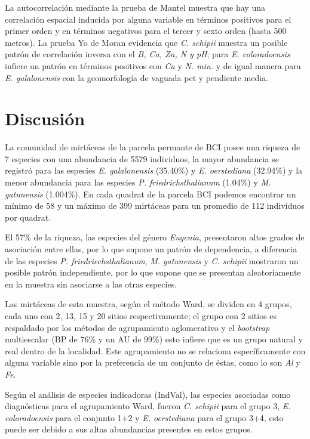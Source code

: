 \documentclass[11pt,]{article}
\begin{document}
La autocorrelación mediante la prueba de Mantel muestra que hay una
correlación espacial inducida por alguna variable en términos positivos
para el primer orden y en términos negativos para el tercer y sexto
orden (hasta 500 metros). La prueba Yo de Moran evidencia que \emph{C.
schipii} muestra un posible patrón de correlación inversa con el
\emph{B, Ca, Zn, N y pH}; para \emph{E. coloradoensis} infiere un patrón
en términos positivos con \emph{Ca} y \emph{N. min.} y de igual manera
para \emph{E. galalonensis} con la geomorfología de vaguada pct y
pendiente media.

\section{Discusión}\label{discusiuxf3n}

La comunidad de mirtáceas de la parcela permante de BCI posee una
riqueza de 7 especies con una abundancia de 5579 individuos, la mayor
abundancia se registró para las especies \emph{E. galalonensis}
(35.40\%) y \emph{E. oerstediana} (32.94\%) y la menor abundancia para
las especies \emph{P. friedrichsthalianum} (1.04\%) y \emph{M.
gatunensis} (1.004\%). En cada quadrat de la parcela BCI podemos
encontrar un mínimo de 58 y un máximo de 399 mirtáceas para un promedio
de 112 individuos por quadrat.

El 57\% de la riqueza, las especies del género \emph{Eugenia},
presentaron altos grados de asociación entre ellas, por lo que supone un
patrón de dependencia, a diferencia de las especies \emph{P.
friedriechsthalianum}, \emph{M. gatunensis} y \emph{C. schipii}
mostraron un posible patrón independiente, por lo que supone que se
presentan aleatoriamente en la muestra sin asociarse a las otras
especies.

Las mirtáceas de esta muestra, según el método Ward, se dividen en 4
grupos, cada uno con 2, 13, 15 y 20 sitios respectivamente; el grupo con
2 sitios es respaldado por los métodos de agrupamiento aglomerativo y el
\emph{bootstrap} multiescalar (BP de 76\% y un AU de 99\%) esto infiere
que es un grupo natural y real dentro de la localidad. Este agrupamiento
no se relaciona específicamente con alguna variable sino por la
preferencia de un conjunto de éstas, como lo son \emph{Al} y \emph{Fe}.

Según el análisis de especies indicadoras (IndVal), las especies
asociadas como diagnósticas para el agrupamiento Ward, fueron \emph{C.
schipii} para el grupo 3, \emph{E. coloradoensis} para el conjunto 1+2 y
\emph{E. oerstediana} para el grupo 3+4, esto puede ser debido a sus
altas abundancias presentes en estos grupos.
\end{document}
